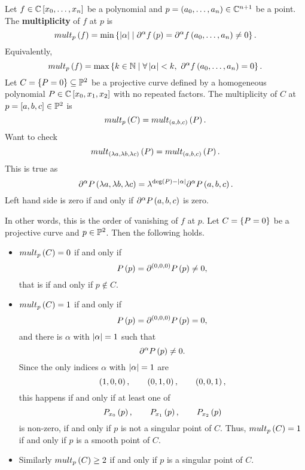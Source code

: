\begin{definition}
Let $ f \in \C\sb{x_0, \dots, x_n} $ be a polynomial and $ p = \rb{a_0, \dots, a_n} \in \C^{n + 1} $ be a point. The \textbf{multiplicity} of $ f $ at $ p $ is
$$ mult_p\rb{f} = \min\cb{\abs{\alpha} \mid \partial^\alpha f\rb{p} = \partial^\alpha f\rb{a_0, \dots, a_n} \ne 0}. $$
Equivalently,
$$ mult_p\rb{f} = \max\cb{k \in \N \mid \forall \abs{\alpha} < k, \ \partial^\alpha f\rb{a_0, \dots, a_n} = 0}. $$
Let $ C = \cb{P = 0} \subseteq \P^2 $ be a projective curve defined by a homogeneous polynomial $ P \in \C\sb{x_0, x_1, x_2} $ with no repeated factors. The multiplicity of $ C $ at $ p = \sb{a, b, c} \in \P^2 $ is
$$ mult_p\rb{C} = mult_{\rb{a, b, c}}\rb{P}. $$
Want to check
$$ mult_{\rb{\lambda a, \lambda b, \lambda c}}\rb{P} = mult_{\rb{a, b, c}}\rb{P}. $$
This is true as
$$ \partial^\alpha P\rb{\lambda a, \lambda b, \lambda c} = \lambda^{\deg\rb{P} - \abs{\alpha}}\partial^\alpha P\rb{a, b, c}. $$
Left hand side is zero if and only if $ \partial^\alpha P\rb{a, b, c} $ is zero.
\end{definition}


In other words, this is the order of vanishing of $ f $ at $ p $. Let $ C = \cb{P = 0} $ be a projective curve and $ p \in \P^2 $. Then the following holds.
\begin{itemize}
\item $ mult_p\rb{C} = 0 $ if and only if
$$ P\rb{p} = \partial^{\rb{0, 0, 0}} P\rb{p} \ne 0, $$
that is if and only if $ p \notin C $.
\item $ mult_p\rb{C} = 1 $ if and only if
$$ P\rb{p} = \partial^{\rb{0, 0, 0}} P\rb{p} = 0, $$
and there is $ \alpha $ with $ \abs{\alpha} = 1 $ such that
$$ \partial^{\alpha} P\rb{p} \ne 0. $$
Since the only indices $ \alpha $ with $ \abs{\alpha} = 1 $ are
$$ \rb{1, 0, 0}, \qquad \rb{0, 1, 0}, \qquad \rb{0, 0, 1}, $$
this happens if and only if at least one of
$$ P_{x_0}\rb{p}, \qquad P_{x_1}\rb{p}, \qquad P_{x_2}\rb{p} $$
is non-zero, if and only if $ p $ is not a singular point of $ C $. Thus, $ mult_p\rb{C} = 1 $ if and only if $ p $ is a smooth point of $ C $.
\item Similarly $ mult_p\rb{C} \ge 2 $ if and only if $ p $ is a singular point of $ C $.
\end{itemize}


